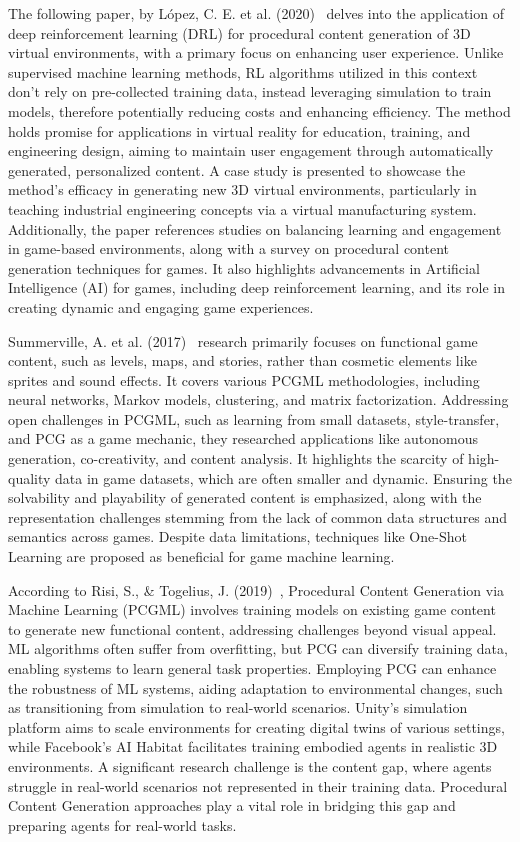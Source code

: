 \documentclass[runningheads]{llncs}
\begin{document}
The following paper, by López, C. E. et al. (2020)~\cite{ref_article24} delves into the application of deep reinforcement learning (DRL) for procedural content generation of 3D virtual environments, with a primary focus on enhancing user experience. Unlike supervised machine learning methods, RL algorithms utilized in this context don't rely on pre-collected training data, instead leveraging simulation to train models, therefore potentially reducing costs and enhancing efficiency. The method holds promise for applications in virtual reality for education, training, and engineering design, aiming to maintain user engagement through automatically generated, personalized content. A case study is presented to showcase the method's efficacy in generating new 3D virtual environments, particularly in teaching industrial engineering concepts via a virtual manufacturing system. Additionally, the paper references studies on balancing learning and engagement in game-based environments, along with a survey on procedural content generation techniques for games. It also highlights advancements in Artificial Intelligence (AI) for games, including deep reinforcement learning, and its role in creating dynamic and engaging game experiences.

Summerville, A. et al. (2017)~\cite{ref_article25} research primarily focuses on functional game content, such as levels, maps, and stories, rather than cosmetic elements like sprites and sound effects. It covers various PCGML methodologies, including neural networks, Markov models, clustering, and matrix factorization. Addressing open challenges in PCGML, such as learning from small datasets, style-transfer, and PCG as a game mechanic, they researched applications like autonomous generation, co-creativity, and content analysis. It highlights the scarcity of high-quality data in game datasets, which are often smaller and dynamic. Ensuring the solvability and playability of generated content is emphasized, along with the representation challenges stemming from the lack of common data structures and semantics across games. Despite data limitations, techniques like One-Shot Learning are proposed as beneficial for game machine learning.

According to Risi, S., \& Togelius, J. (2019)~\cite{ref_article10}, Procedural Content Generation via Machine Learning (PCGML) involves training models on existing game content to generate new functional content, addressing challenges beyond visual appeal. ML algorithms often suffer from overfitting, but PCG can diversify training data, enabling systems to learn general task properties. Employing PCG can enhance the robustness of ML systems, aiding adaptation to environmental changes, such as transitioning from simulation to real-world scenarios. Unity's simulation platform aims to scale environments for creating digital twins of various settings, while Facebook's AI Habitat facilitates training embodied agents in realistic 3D environments. A significant research challenge is the content gap, where agents struggle in real-world scenarios not represented in their training data. Procedural Content Generation approaches play a vital role in bridging this gap and preparing agents for real-world tasks.
\end{document}
